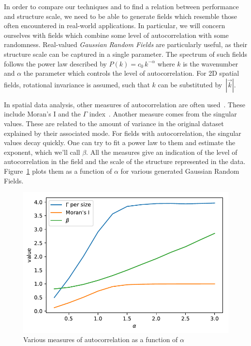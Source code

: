 \documentclass{acm_proc_article-sp}
\begin{document}
In order to compare our techniques and to find a relation between performance and structure scale, we need to be able to generate fields which resemble those often encountered in real-world applications. In particular, we will concern ourselves with fields which combine some level of autocorrelation with  some randomness. Real-valued \textit{Gaussian Random Fields} are particularly useful, as their structure scale can be captured in a single parameter. The spectrum of such fields follows the power law described by $P(k) = c_{0} \, k^{-\alpha}$ where $k$ is the wavenumber and $\alpha$ the parameter which controls the level of autocorrelation. For 2D spatial fields, rotational invariance is assumed, such that $k$ can be substituted by~$|\vec{k}|$.

In spatial data analysis, other measures of autocorrelation are often used~\cite{Eshel2011, Storch1999}. These include Moran's I and the $\Gamma$ index~\cite{Moran1950, Hubert1981, PySAL}. Another measure comes from the singular values. These are related to the amount of variance in the original dataset explained by their associated mode. For fields with autocorrelation, the singular values decay quickly. One can try to fit a power law to them and estimate the exponent, which we'll call $\beta$. %
All the measures give an indication of the level of autocorrelation in the field and the scale of the structure represented in the data. Figure~\ref{fig:plotGammaAndMoransIAndBeta} plots them as a function of $\alpha$ for various generated Gaussian Random Fields.
\begin{figure}[h]
\begin{center}
\includegraphics[width=0.8\columnwidth]{Results/plotGammaAndMoransIAndBeta.pdf}
\caption[Various measures of autocorrelation]{Various measures of autocorrelation as a function of $\alpha$}
\label{fig:plotGammaAndMoransIAndBeta}
\end{center}
\end{figure}
\end{document}
